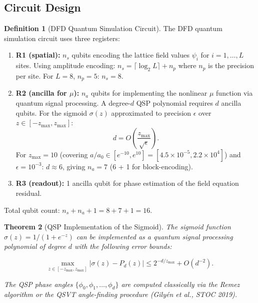 \documentclass[11pt]{article}
\newtheorem{theorem}{Theorem}[section]
\theoremstyle{definition}
\newtheorem{definition}[theorem]{Definition}
\theoremstyle{remark}
\newcommand{\ee}[1]{\times 10^{#1}}
\begin{document}
\subsection{Circuit Design}
\label{sec:circuit-design}

\begin{definition}[DFD Quantum Simulation Circuit]
\label{def:dfd-circuit}
The DFD quantum simulation circuit uses three registers:

\begin{enumerate}
\item \textbf{R1 (spatial):} $n_s$ qubits encoding the lattice field values
  $\psi_i$ for $i = 1, \ldots, L$ sites. Using amplitude encoding:
  $n_s = \lceil \log_2 L \rceil + n_p$ where $n_p$ is the precision
  per site. For $L = 8$, $n_p = 5$: $n_s = 8$.

\item \textbf{R2 (ancilla for $\mu$):} $n_a$ qubits for implementing the
  nonlinear $\mu$ function via quantum signal processing. A degree-$d$
  QSP polynomial requires $d$ ancilla qubits. For the sigmoid $\sigma(z)$
  approximated to precision $\epsilon$ over $z \in [-z_{\max}, z_{\max}]$:
  \begin{equation}
    d = O\!\left(\frac{z_{\max}}{\sqrt{\epsilon}}\right).
    \label{eq:qsp-degree}
  \end{equation}
  For $z_{\max} = 10$ (covering $a/a_0 \in [e^{-10}, e^{10}] = [4.5\ee{-5}, 2.2\ee{4}]$)
  and $\epsilon = 10^{-3}$: $d \approx 6$, giving $n_a = 7$ (6 + 1 for
  block-encoding).

\item \textbf{R3 (readout):} 1 ancilla qubit for phase estimation of
  the field equation residual.
\end{enumerate}

Total qubit count: $n_s + n_a + 1 = 8 + 7 + 1 = 16$.
\end{definition}

\begin{theorem}[QSP Implementation of the Sigmoid]
\label{thm:qsp-sigmoid}
The sigmoid function $\sigma(z) = 1/(1 + e^{-z})$ can be implemented as
a quantum signal processing polynomial of degree $d$ with the following
error bounds:

\begin{equation}
  \max_{z \in [-z_{\max}, z_{\max}]} |\sigma(z) - P_d(z)| \leq
  2^{-d/z_{\max}} + O(d^{-2}).
  \label{eq:qsp-error}
\end{equation}

The QSP phase angles $\{\phi_0, \phi_1, \ldots, \phi_d\}$ are computed
classically via the Remez algorithm or the QSVT angle-finding procedure
(Gily\'{e}n et al., STOC 2019).
\end{theorem}
\end{document}

